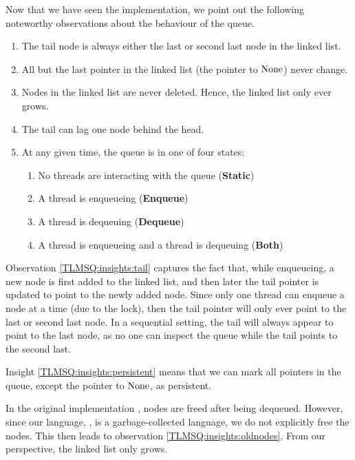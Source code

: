 \documentclass[a4paper, 10pt]{report}
\theoremstyle{definition}
\newcommand{\StaticState}{\textbf{Static}\xspace}
\newcommand{\EnqueueState}{\textbf{Enqueue}\xspace}
\newcommand{\DequeueState}{\textbf{Dequeue}\xspace}
\newcommand{\BothState}{\textbf{Both}\xspace}
\begin{document}
Now that we have seen the implementation, we point out the following noteworthy observations about the behaviour of the queue.
\begin{enumerate}
  \item\label{TLMSQ:insights:tail} The tail node is always either the last or second last node in the linked list.
  \item\label{TLMSQ:insights:persistent} All but the last pointer in the linked list (the pointer to $\operatorname{None}$) never change.
  \item\label{TLMSQ:insights:oldnodes} Nodes in the linked list are never deleted. Hence, the linked list only ever grows.
  \item\label{TLMSQ:insights:lag} The tail can lag one node behind the head.
  \item\label{TLMSQ:insights:states} At any given time, the queue is in one of four states:
    \begin{enumerate}
      \item\label{TLMSQ:insights:state:static} No threads are interacting with the queue (\StaticState)
      \item\label{TLMSQ:insights:state:enqueue} A thread is enqueueing (\EnqueueState)
      \item\label{TLMSQ:insights:state:dequeue} A thread is dequeuing (\DequeueState)
      \item\label{TLMSQ:insights:state:both} A thread is enqueueing and a thread is dequeuing (\BothState)
    \end{enumerate}
\end{enumerate}

Observation \ref{TLMSQ:insights:tail} captures the fact that, while enqueueing, a new node is first added to the linked list, and then later the tail pointer is updated to point to the newly added node. Since only one thread can enqueue a node at a time (due to the lock), then the tail pointer will only ever point to the last or second last node. In a sequential setting, the tail will always appear to point to the last node, as no one can inspect the queue while the tail points to the second last.

Insight \ref{TLMSQ:insights:persistent} means that we can mark all pointers in the queue, except the pointer to $\operatorname{None}$, as persistent.

In the original implementation \citep{DBLP:conf/podc/MichaelS96}, nodes are freed after being dequeued. However, since our language, \heaplang, is a garbage-collected language, we do not explicitly free the nodes. This then leads to observation \ref{TLMSQ:insights:oldnodes}. From our perspective, the linked list only grows.
\end{document}
